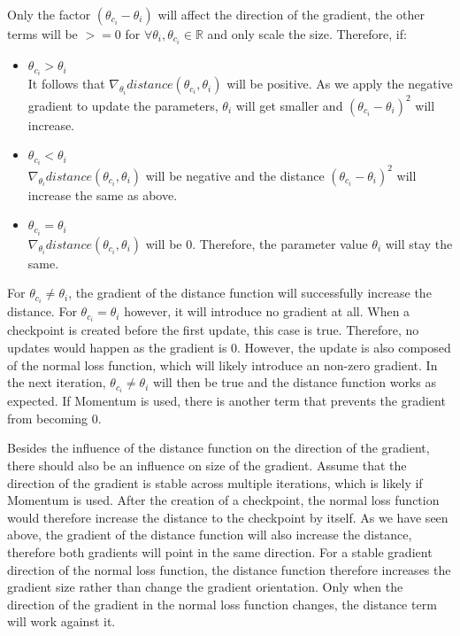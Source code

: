 Only the factor $(\theta_{c_i} - \theta_i)$ will affect the direction of the
gradient, the other terms will be $>=0$ for $\forall \theta_i , \theta_{c_i}\in
\mathbb{R}$ and only scale the size. Therefore, if:
\begin{itemize}
    \item $\theta_{c_i} > \theta_i$\\
        It follows that $\nabla_{\theta_i} distance(\theta_{c_i}, \theta_i)$
        will be positive. As we apply the negative gradient to update the
        parameters, $\theta_i$ will get smaller and  $(\theta_{c_i} - \theta_i)^2$
        will increase.
    \item $\theta_{c_i} < \theta_i$\\
        $\nabla_{\theta_i} distance(\theta_{c_i}, \theta_i)$ will be negative
        and the distance $(\theta_{c_i} - \theta_i)^2$ will increase the same as
        above.
    \item $\theta_{c_i} = \theta_i$\\
        $\nabla_{\theta_i} distance(\theta_{c_i}, \theta_i)$ will be 0.
        Therefore, the parameter value $\theta_i$ will stay the same.
\end{itemize} 

For $\theta_{c_i} \neq \theta_i$, the gradient of the distance function will
successfully increase the distance. For $\theta_{c_i} = \theta_i$ however, it
will introduce no gradient at all. When a checkpoint is created before the
first update, this case is true. Therefore, no updates would happen as the
gradient is 0. However, the update is also composed of the normal loss function,
which will likely introduce an non-zero gradient. In the next iteration,
$\theta_{c_i} \neq \theta_i$ will then be true and the distance function works
as expected. If Momentum is used, there is another term that prevents the
gradient from becoming 0.


Besides the influence of the distance function on the direction of the gradient,
there should also be an influence on size of the gradient. Assume that the
direction of the gradient is stable across multiple iterations, which is likely
if Momentum is used. After the creation of a checkpoint, the normal loss
function would therefore increase the distance to the checkpoint by itself. As
we have seen above, the gradient of the distance function will also increase the
distance, therefore both gradients will point in the same direction. For a
stable gradient direction of the normal loss function, the distance function
therefore increases the gradient size rather than change the gradient
orientation. Only when the direction of the gradient in the normal loss function
changes, the distance term will work against it.

